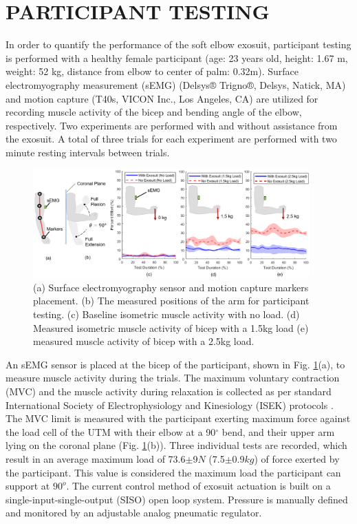 \documentclass[letterpaper, 10 pt, conference]{ieeeconf}  %
\begin{document}
\section{PARTICIPANT TESTING}

In order to quantify the performance of the soft elbow exosuit, participant testing is performed with a healthy female participant (age: 23 years old, height: 1.67 m, weight: 52 kg, distance from elbow to center of palm: 0.32m). Surface electromyography measurement (sEMG) (Delsys® Trigno®, Delsys, Natick, MA) and motion capture (T40s, VICON Inc., Los Angeles, CA) are utilized for recording muscle activity of the bicep and bending angle of the elbow, respectively. Two experiments are performed with and without assistance from the exosuit. A total of three trials for each experiment are performed with two minute resting intervals between trials.


\begin{figure}[t]
\centering
\includegraphics[width=0.95\textwidth]{EMG_Stuff2.PNG}
\caption{(a) Surface electromyography sensor and motion capture markers placement. (b) The measured positions of the arm for participant testing. (c) Baseline isometric muscle activity with no load. (d) Measured isometric muscle activity of bicep with a 1.5kg load (e) measured muscle activity of bicep with a 2.5kg load.}
\label{fig:EMG}
\vspace{-1em}
\end{figure}

An sEMG sensor is placed at the bicep of the participant, shown in Fig. \ref{fig:EMG}(a), to measure muscle activity during the trials. The maximum voluntary contraction (MVC) and the muscle activity during relaxation is collected as per standard  International Society of Electrophysiology and Kinesiology (ISEK) protocols \cite{2018I}. The MVC limit is measured with the participant exerting maximum force against the load cell of the UTM with their elbow at a 90$^{\circ}$ bend, and their upper arm lying on the coronal plane (Fig. \ref{fig:EMG}(b)). Three individual tests are recorded, which result in an average maximum load of 73.6$\pm$9$N$ (7.5$\pm$0.9$kg$) of force exerted by the participant.  This value is considered the maximum load the participant can support at $90^o$. The current control method of exosuit actuation is built on a single-input-single-output (SISO) open loop system. Pressure is manually defined and monitored by an adjustable analog pneumatic regulator.
\end{document}
